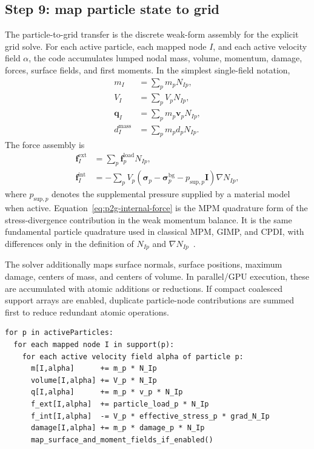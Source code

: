 \subsection{Step 9: map particle state to grid}
\label{subsec:solver-step-9}
The particle-to-grid transfer is the discrete weak-form assembly for the explicit grid solve.  For each active particle, each mapped node $I$, and each active velocity field $\alpha$, the code accumulates lumped nodal mass, volume, momentum, damage, forces, surface fields, and first moments.  In the simplest single-field notation,
\begin{align}
  m_I &= \sum_p m_p N_{Ip}, \\
  V_I &= \sum_p V_p N_{Ip}, \\
  \mathbf{q}_I &= \sum_p m_p \mathbf{v}_p N_{Ip}, \\
  d_I^{\mathrm{mass}} &= \sum_p m_p d_p N_{Ip}.
\end{align}
The force assembly is
\begin{align}
  \mathbf{f}^{\mathrm{ext}}_I &= \sum_p \mathbf{f}_{p}^{\mathrm{load}} N_{Ip}, \\
  \mathbf{f}^{\mathrm{int}}_I &= -\sum_p V_p\left(\boldsymbol{\sigma}_p-\boldsymbol{\sigma}_{p}^{\mathrm{bg}}-p_{\mathrm{sup},p}\mathbf{I}\right)\nabla N_{Ip},
  \label{eq:p2g-internal-force}
\end{align}
where $p_{\mathrm{sup},p}$ denotes the supplemental pressure supplied by a material model when active.  Equation~\eqref{eq:p2g-internal-force} is the MPM quadrature form of the stress-divergence contribution in the weak momentum balance.  It is the same fundamental particle quadrature used in classical MPM, GIMP, and CPDI, with differences only in the definition of $N_{Ip}$ and $\nabla N_{Ip}$~\cite{sulsky1994history,bardenhagen2004gimp,sadeghirad2011cpdi,steffen2008quadrature}.

The solver additionally maps surface normals, surface positions, maximum damage, centers of mass, and centers of volume.  In parallel/GPU execution, these are accumulated with atomic additions or reductions.  If compact coalesced support arrays are enabled, duplicate particle-node contributions are summed first to reduce redundant atomic operations.

\begin{lstlisting}[caption={Particle-to-grid transfer.},basicstyle=\ttfamily\small]
for p in activeParticles:
  for each mapped node I in support(p):
    for each active velocity field alpha of particle p:
      m[I,alpha]      += m_p * N_Ip
      volume[I,alpha] += V_p * N_Ip
      q[I,alpha]      += m_p * v_p * N_Ip
      f_ext[I,alpha]  += particle_load_p * N_Ip
      f_int[I,alpha]  -= V_p * effective_stress_p * grad_N_Ip
      damage[I,alpha] += m_p * damage_p * N_Ip
      map_surface_and_moment_fields_if_enabled()
\end{lstlisting}

